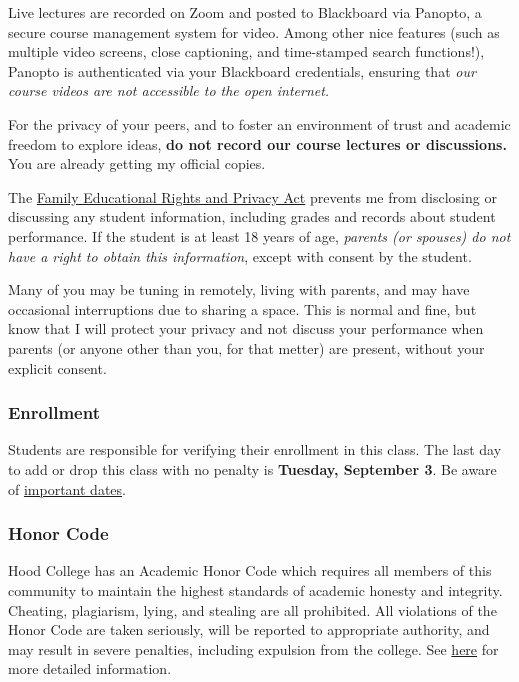 \documentclass{article}
\begin{document}
Live lectures are recorded on Zoom and posted to Blackboard via Panopto,
a secure course management system for video. Among other nice features
(such as multiple video screens, close captioning, and time-stamped
search functions!), Panopto is authenticated via your Blackboard
credentials, ensuring that \emph{our course videos are not accessible to
the open internet.}

For the privacy of your peers, and to foster an environment of trust and
academic freedom to explore ideas, \textbf{do not record our course
lectures or discussions.} You are already getting my official copies.

The
\href{https://www2.ed.gov/policy/gen/guid/fpco/ferpa/index.html}{Family
Educational Rights and Privacy Act} prevents me from disclosing or
discussing any student information, including grades and records about
student performance. If the student is at least 18 years of age,
\emph{parents (or spouses) do not have a right to obtain this
information}, except with consent by the student.

Many of you may be tuning in remotely, living with parents, and may have
occasional interruptions due to sharing a space. This is normal and
fine, but know that I will protect your privacy and not discuss your
performance when parents (or anyone other than you, for that metter) are
present, without your explicit consent.

\hypertarget{enrollment}{%
\subsubsection*{Enrollment}\label{enrollment}}

Students are responsible for verifying their enrollment in this class.
The last day to add or drop this class with no penalty is
\textbf{Tuesday, September 3}. Be aware of
\href{https://www.hood.edu/offices-services/registrars-office/academic-calendar}{important
dates}.

\hypertarget{honor-code}{%
\subsubsection*{Honor Code}\label{honor-code}}

Hood College has an Academic Honor Code which requires all members of
this community to maintain the highest standards of academic honesty and
integrity. Cheating, plagiarism, lying, and stealing are all prohibited.
All violations of the Honor Code are taken seriously, will be reported
to appropriate authority, and may result in severe penalties, including
expulsion from the college. See
\href{http://hood.smartcatalogiq.com/en/2016-2017/Catalog/The-Spirit-of-Hood/The-Academic-Honor-Code-and-Code-of-Conduct}{here}
for more detailed information.
\end{document}
